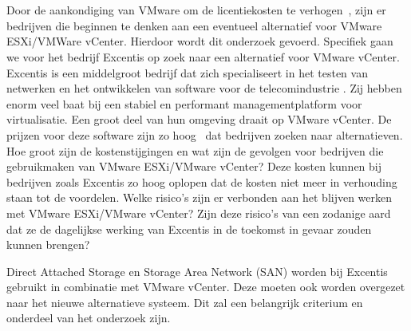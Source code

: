 
\chapter{}%
\label{ch:inleiding}

\section{}%
\label{sec:probleemstelling}

Door de aankondiging van VMware om de licentiekosten te verhogen~\autocite{device42_2024}, zijn er bedrijven die beginnen te denken aan een eventueel alternatief voor VMware ESXi/VMWare vCenter.
Hierdoor wordt dit onderzoek gevoerd. Specifiek gaan we voor het bedrijf Excentis op zoek naar een alternatief voor VMware vCenter.
Excentis is een middelgroot bedrijf dat zich specialiseert in het testen van netwerken en het ontwikkelen van software voor de telecomindustrie \autocite{excentis2025}.
Zij hebben enorm veel baat bij een stabiel en performant managementplatform voor virtualisatie. Een groot deel van hun omgeving draait op VMware vCenter.
De prijzen voor deze software zijn zo hoog~\autocite{Hale2024} dat bedrijven zoeken naar alternatieven.
Hoe groot zijn de kostenstijgingen en wat zijn de gevolgen voor bedrijven die gebruikmaken van VMware ESXi/VMware vCenter?
Deze kosten kunnen bij bedrijven zoals Excentis zo hoog oplopen dat de kosten niet meer in verhouding staan tot de voordelen.
Welke risico's zijn er verbonden aan het blijven werken met VMware ESXi/VMware vCenter?
Zijn deze risico’s van een zodanige aard dat ze de dagelijkse werking van Excentis in de toekomst in gevaar zouden kunnen brengen?

Direct Attached Storage en Storage Area Network (SAN) worden bij Excentis gebruikt in combinatie met VMware vCenter.
Deze moeten ook worden overgezet naar het nieuwe alternatieve systeem. Dit zal een belangrijk criterium en onderdeel van het onderzoek zijn.

